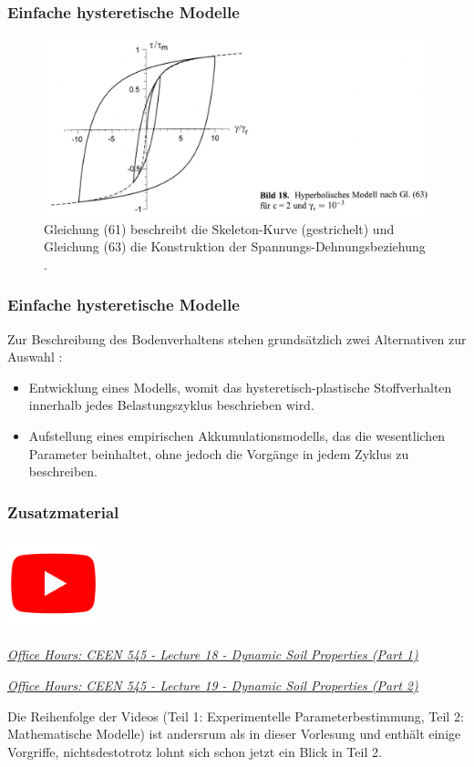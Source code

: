 \documentclass[hyperref={pdfpagemode=FullScreen, colorlinks=false}]{beamer}
\begin{document}
\begin{frame}
\frametitle{Einfache hysteretische Modelle}
\begin{figure}
\centering
\includegraphics[width=0.95\linewidth]{fig_img/bild18.jpg}
\caption*{Gleichung (61) beschreibt die Skeleton-Kurve (gestrichelt)
und Gleichung (63) die Konstruktion der Spannungs-Dehnungsbeziehung
\cite{Vrettos2017}.} 
\end{figure}
\end{frame}

\begin{frame}
\frametitle{Einfache hysteretische Modelle}
Zur Beschreibung des Bodenverhaltens stehen grundsätzlich zwei Alternativen zur Auswahl \cite{Vrettos2017}:
\begin{itemize}
 \item Entwicklung eines Modells, womit das hysteretisch-plastische Stoffverhalten innerhalb jedes Belastungszyklus beschrieben wird. 
 \item Aufstellung eines empirischen Akkumulationsmodells, das die wesentlichen Parameter beinhaltet, ohne jedoch die Vorgänge in jedem Zyklus zu beschreiben.
\end{itemize}
\end{frame}

\begin{frame}
\frametitle{Zusatzmaterial} %
\vfill
\begin{center}
\includegraphics[width=0.2\textwidth]{fig_img/youtube.png}  

\href{https://www.youtube.com/watch?v=01_KWg3QriE}{\textsl{Office Hours: CEEN 545 - Lecture 18 - Dynamic Soil Properties (Part 1)}}

\href{https://www.youtube.com/watch?v=Mngr3tujIjM}{\textsl{Office Hours: CEEN 545 - Lecture 19 - Dynamic Soil Properties (Part 2)}}
\end{center}  
\vfill
Die Reihenfolge der Videos (Teil 1: Experimentelle Parameterbestimmung, Teil 2: Mathematische Modelle) ist andersrum als in dieser Vorlesung und enthält einige Vorgriffe, nichtsdestotrotz lohnt sich schon jetzt ein Blick in Teil 2.

\end{frame}
\end{document}
